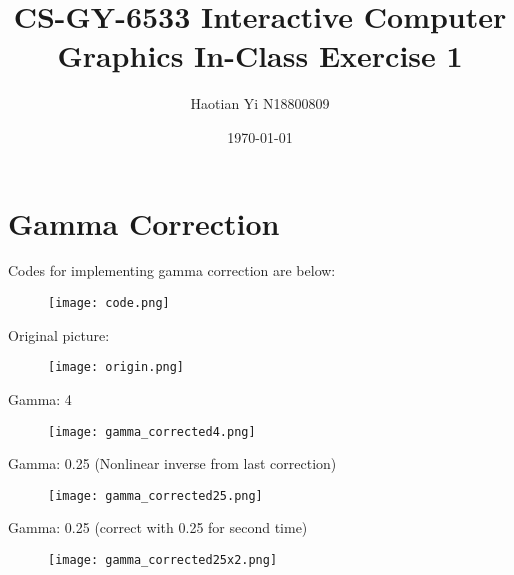 \documentclass[11pt,a4paper,fleqn]{article}
\title{CS-GY-6533 Interactive Computer Graphics In-Class Exercise 1}
\author{Haotian Yi N18800809}
\date{\today}
\begin{document}
\maketitle

\section{Gamma Correction}
Codes for implementing gamma correction are below:
\begin{figure}[H]
	\centering
	\texttt{[image: code.png]}
\end{figure}

Original picture:
\begin{figure}[H]
	\centering
	\texttt{[image: origin.png]}
\end{figure}
Gamma: 4
\begin{figure}[H]
	\centering
	\texttt{[image: gamma\_corrected4.png]}
\end{figure}
Gamma: 0.25 (Nonlinear inverse from last correction)
\begin{figure}[H]
	\centering
	\texttt{[image: gamma\_corrected25.png]}
\end{figure}
Gamma: 0.25 (correct with 0.25 for second time)
\begin{figure}[H]
	\centering
	\texttt{[image: gamma\_corrected25x2.png]}
\end{figure}
\end{document}
